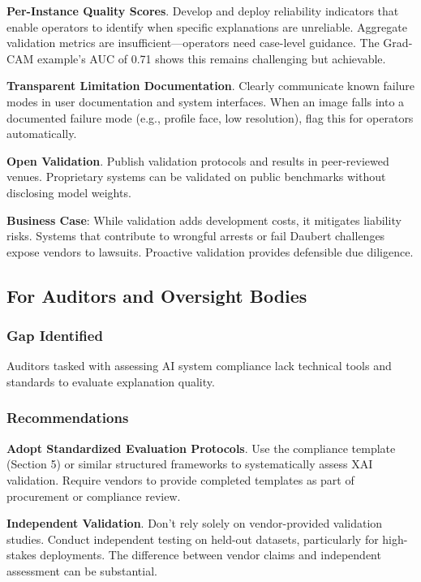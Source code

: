 \textbf{Per-Instance Quality Scores}. Develop and deploy reliability indicators that enable operators to identify when specific explanations are unreliable. Aggregate validation metrics are insufficient—operators need case-level guidance. The Grad-CAM example's AUC of 0.71 shows this remains challenging but achievable.

\textbf{Transparent Limitation Documentation}. Clearly communicate known failure modes in user documentation and system interfaces. When an image falls into a documented failure mode (e.g., profile face, low resolution), flag this for operators automatically.

\textbf{Open Validation}. Publish validation protocols and results in peer-reviewed venues. Proprietary systems can be validated on public benchmarks without disclosing model weights.

\textbf{Business Case}: While validation adds development costs, it mitigates liability risks. Systems that contribute to wrongful arrests or fail Daubert challenges expose vendors to lawsuits. Proactive validation provides defensible due diligence.

\subsection{For Auditors and Oversight Bodies}

\subsubsection{Gap Identified}

Auditors tasked with assessing AI system compliance lack technical tools and standards to evaluate explanation quality.

\subsubsection{Recommendations}

\textbf{Adopt Standardized Evaluation Protocols}. Use the compliance template (Section 5) or similar structured frameworks to systematically assess XAI validation. Require vendors to provide completed templates as part of procurement or compliance review.

\textbf{Independent Validation}. Don't rely solely on vendor-provided validation studies. Conduct independent testing on held-out datasets, particularly for high-stakes deployments. The difference between vendor claims and independent assessment can be substantial.

